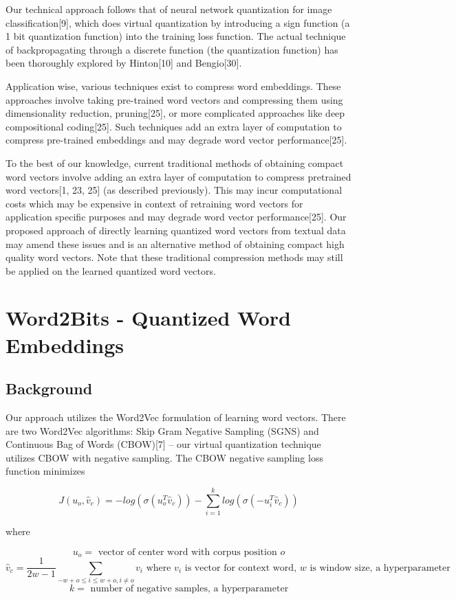 \documentclass{article} %
\begin{document}
Our technical approach follows that of neural network quantization for
image classification[9], which does virtual quantization by
introducing a sign function (a 1 bit quantization function) into the
training loss function. The actual technique of backpropagating through a
discrete function (the quantization function) has been thoroughly
explored by Hinton[10] and Bengio[30].

Application wise, various techniques exist to compress word
embeddings. These approaches involve taking pre-trained word
vectors and compressing them using dimensionality reduction,
pruning[25], or more complicated approaches like deep compositional
coding[25]. Such techniques add an extra layer of computation to
compress pre-trained embeddings and may degrade word vector
performance[25].

To the best of our knowledge, current traditional methods of obtaining
compact word vectors involve adding an extra layer of computation to
compress pretrained word vectors[1, 23, 25] (as described previously). This
may incur computational costs which may be expensive in context of
retraining word vectors for application specific purposes and may
degrade word vector performance[25]. Our proposed approach of directly
learning quantized word vectors from textual data may amend these
issues and is an alternative method of obtaining compact high quality
word vectors. Note that these traditional compression methods may
still be applied on the learned quantized word vectors.

\section{Word2Bits - Quantized Word Embeddings}
\subsection{Background}
Our approach utilizes the Word2Vec formulation of learning word vectors. There
are two Word2Vec algorithms: Skip Gram Negative Sampling (SGNS) and
Continuous Bag of Words (CBOW)[7] -- our virtual quantization
technique utilizes CBOW with negative sampling. The CBOW negative
sampling loss function minimizes

$$
J(u_o, \hat{v}_c) = -log(\sigma(u_o^T\hat{v}_c)) - \sum_{i=1}^{k} log(\sigma(-u_i^T\hat{v}_c))
$$

where

$$
u_o = \mbox{ vector of center word with corpus position } o
$$
$$
\hat{v}_c = \frac{1}{2w-1}\sum_{-w+o \leq i \leq w+o,i \neq o} v_i \mbox{  where } v_i \mbox{ is vector for context word, } w \mbox{ is window size, a hyperparameter}
$$
$$
k = \mbox{ number of negative samples, a hyperparameter}
$$
\end{document}
